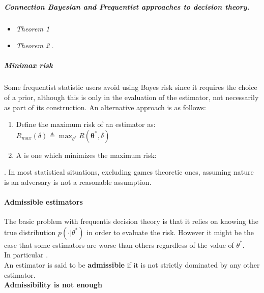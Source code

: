 \subparagraph{Connection Bayesian and Frequentist approaches to decision theory.}
\begin{itemize}
    \item \emph{Theorem 1} 
    \item \emph{Theorem 2} .
\end{itemize}

\subparagraph{Minimax risk}
Some frequentist statistic users avoid using Bayes risk since it requires the choice of
a prior, although this is only in the evaluation of the estimator, not necessarily as 
part of its construction. An alternative approach is as follows:
\begin{enumerate}
    \item Define the  maximum risk of an estimator as:\\
        $R_{max}(\delta) \triangleq \displaystyle\max_{\theta^{*}}R(\bm{\theta}^{*},
        \delta)$
    \item A  is one which minimizes the maximum risk:
\end{enumerate}
.
In most statistical situations, excluding games theoretic ones, assuming nature is an
adversary is not a reasonable assumption.


\paragraph{Admissible estimators}
The basic problem with frequentis decision theory is that it relies on knowing the true
distribution $p(\cdot|\theta^{*})$ in order to evaluate the risk. However it might be 
the case that some estimators are worse than others regardless of the value of 
$\theta^{*}$.\\
In particular .\\
An estimator is said to be \textbf{admissible} if it is not strictly dominated by any 
other estimator.\\
\textbf{Admissibility is not enough}
